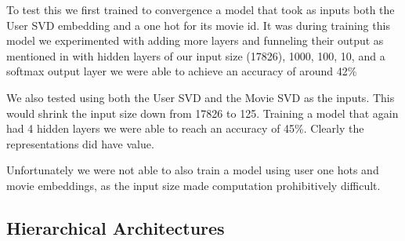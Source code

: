 To test this we first trained to convergence a model that took as inputs both the User SVD embedding and a one hot for its movie id. It was during training this model we experimented with adding more layers and funneling their output as mentioned in \cite{He2017} with hidden layers of our input size (17826), 1000, 100, 10, and a softmax output layer we were able to achieve an accuracy of around 42\%

We also tested using both the User SVD and the Movie SVD as the inputs. This would shrink the input size down from 17826 to 125. Training a model that again had 4 hidden layers we were able to reach an accuracy of 45\%. Clearly the representations did have value.

Unfortunately we were not able to also train a model using user one hots and movie embeddings, as the input size made computation prohibitively difficult. 



\subsection{Hierarchical Architectures}
